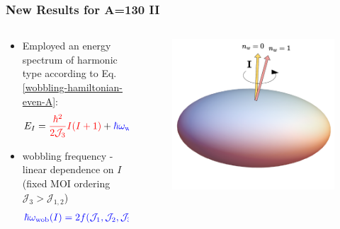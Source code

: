 \documentclass{beamer}
\begin{document}
\begin{frame}
  \frametitle{New Results for A=130 II}
  \begin{columns}
    \begin{column}{0.65\textwidth}
        \begin{itemize}
          \item Employed an energy spectrum of harmonic type according to Eq. \ref{wobbling-hamiltonian-even-A}:
          \begin{align}
            E_{I}={\color{red}\frac{\hbar^2}{2\mathcal{J}_3}I(I+1)}+{\color{blue}\hbar\omega_\text{wob}\left(n_w+\frac{1}{2}\right)}\nonumber
          \end{align}
          \item wobbling frequency - linear dependence on $I$ (fixed MOI ordering $\mathcal{J}_3>\mathcal{J}_{1,2}$)
          \begin{align}
            {\color{blue}\hbar\omega_\text{wob}(I)=2f(\mathcal{J}_1,\mathcal{J}_2,\mathcal{J}_3)\cdot I}\nonumber
          \end{align}
        \end{itemize}
    \end{column}
    \begin{column}{0.4\textwidth}
      \begin{figure}
        \begin{center}
          \includegraphics[scale=0.21]{Figs/triaxial-shapes-even-A.pdf}
        \end{center}
      \end{figure}
    \end{column}
  \end{columns}
\end{frame}
\end{document}
